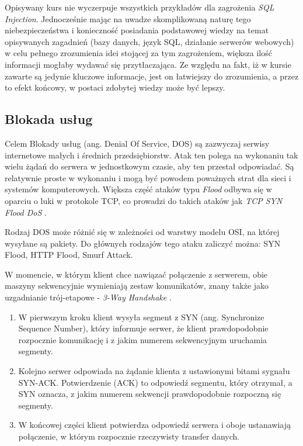 \documentclass[12pt,twoside]{article}
\begin{document}
Opisywany kurs nie wyczerpuje wszystkich przykładów dla zagrożenia \emph{SQL Injection}. Jednocześnie mając na uwadze skomplikowaną naturę tego niebezpieczeństwa i konieczność posiadania podstawowej wiedzy na temat opisywanych zagadnień (bazy danych, język SQL, działanie serwerów webowych) w celu pełnego zrozumienia idei stojącej za tym zagrożeniem, większa ilość informacji mogłaby wydawać się przytłaczająca. Ze względu na fakt, iż w kursie zawarte są jedynie kluczowe informacje, jest on łatwiejszy do zrozumienia, a przez to efekt końcowy, w postaci zdobytej wiedzy może być lepszy.

\clearpage

\subsection{Blokada usług}

Celem Blokady usług (ang. Denial Of Service, DOS) są zazwyczaj serwisy internetowe małych i średnich przedsiębiorstw. Atak ten polega na wykonaniu tak wielu żądań do serwera w jednostkowym czasie, aby ten przestał odpowiadać. Są relatywnie proste w wykonaniu i mogą być powodem poważnych strat dla sieci i systemów komputerowych. Większa część ataków typu \emph{Flood} odbywa się w oparciu o luki w protokole TCP, co prowadzi do takich ataków jak \emph{TCP SYN Flood DoS} \cite{Ddos}.

Rodzaj DOS może różnić się w zależności od warstwy modelu OSI, na której wysyłane są pakiety. Do głównych rodzajów tego ataku zaliczyć można: SYN Flood, HTTP Flood, Smurf Attack.

W momencie, w którym klient chce nawiązać połączenie z serwerem, obie maszyny sekwencyjnie wymieniają zestaw komunikatów, znany także jako uzgadnianie trój-etapowe - \emph{3-Way Handshake} \cite{3WayHandshake}. 

\begin{enumerate}
	\item W pierwszym kroku klient wysyła segment z SYN (ang. Synchronize Sequence Number), który informuje serwer, że klient prawdopodobnie rozpocznie komunikację i z jakim numerem sekwencyjnym uruchamia segmenty.
	\item Kolejno serwer odpowiada na żądanie klienta z ustawionymi bitami sygnału SYN-ACK. Potwierdzenie (ACK) to odpowiedź segmentu, który otrzymał, a SYN oznacza, z jakim numerem sekwencji prawdopodobnie rozpoczną się segmenty.
	\item W końcowej części klient potwierdza odpowiedź serwera i oboje ustanawiają połączenie, w którym rozpocznie rzeczywisty transfer danych.
\end{enumerate}
\end{document}
